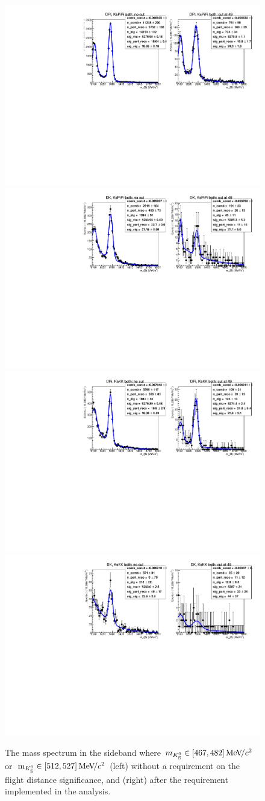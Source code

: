 \begin{figure}[tbp]
    \centering
    \includegraphics[width=0.65\columnwidth]{figures/analysis/FakeKS_ANA_Pi_PiPi_LL_Run1and2_c_both_Ks_FDCHI2_ORIVX.pdf}
    \includegraphics[width=0.65\columnwidth]{figures/analysis/FakeKS_ANA_K_PiPi_LL_Run1and2_c_both_Ks_FDCHI2_ORIVX.pdf}
    \includegraphics[width=0.65\columnwidth]{figures/analysis/FakeKS_ANA_Pi_KK_LL_Run1and2_c_both_Ks_FDCHI2_ORIVX.pdf}
    \includegraphics[width=0.65\columnwidth]{figures/analysis/FakeKS_ANA_K_KK_LL_Run1and2_c_both_Ks_FDCHI2_ORIVX.pdf}
    \caption{The \B mass spectrum in the \KS sideband where $m_{{K}^0_{\mathrm{S}}}\in[467, 482]\text{\,Me\kern -0.1em V\!/}c^2$ or $\text{\,m}_{{K}^0_{\mathrm{S}}}\in[512,527]\text{\,Me\kern -0.1em V\!/}c^2$ (left) without a requirement on the \KS flight distance significance, and (right) after the requirement implemented in the analysis.}
    \label{fig:fake_ks}
\end{figure}


